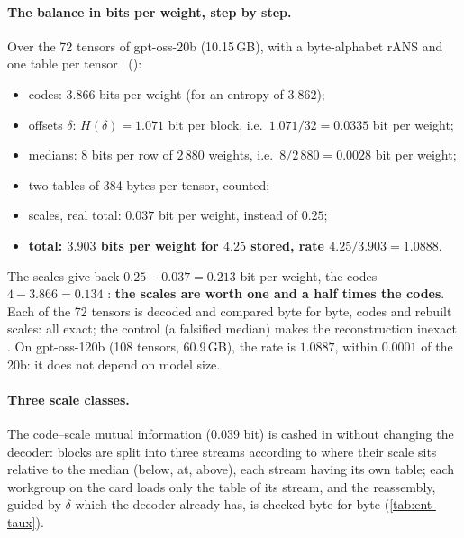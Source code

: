 \paragraph{The balance in bits per weight, step by step.} Over the 72 tensors of gpt-oss-20b (10.15\,GB), with a byte-alphabet rANS and one table per tensor \mes~():
\begin{itemize}
\item codes: $3.866$ bits per weight (for an entropy of $3.862$);
\item offsets $\delta$: $H(\delta) = 1.071$ bit per block, i.e.\ $1.071/32 = 0.0335$ bit per weight;
\item medians: 8 bits per row of $2\,880$ weights, i.e.\ $8/2\,880 = 0.0028$ bit per weight;
\item two tables of 384 bytes per tensor, counted;
\item scales, real total: $0.037$ bit per weight, instead of $0.25$;
\item \textbf{total: $3.903$ bits per weight for $4.25$ stored, rate $4.25/3.903 = 1.0888$}.
\end{itemize}
The scales give back $0.25 - 0.037 = 0.213$ bit per weight, the codes $4 - 3.866 = 0.134$ \calc: \textbf{the scales are worth one and a half times the codes}. Each of the 72 tensors is decoded and compared byte for byte, codes and rebuilt scales: all exact; the control (a falsified median) makes the reconstruction inexact \mes. On gpt-oss-120b (108 tensors, 60.9\,GB), the rate is $1.0887$, within $0.0001$ of the 20b: it does not depend on model size.

\paragraph{Three scale classes.} The code--scale mutual information (0.039 bit) is cashed in without changing the decoder: blocks are split into three streams according to where their scale sits relative to the median (below, at, above), each stream having its own table; each workgroup on the card loads only the table of its stream, and the reassembly, guided by $\delta$ which the decoder already has, is checked byte for byte (\cref{tab:ent-taux}).

